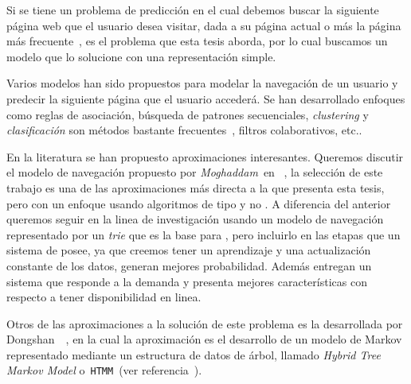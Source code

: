 

Si se tiene un problema de predicción en el cual debemos buscar la siguiente página web que el usuario desea visitar, dada a su página actual o más la página más frecuente~\cite{Poornalatha2012}, es el problema que esta tesis aborda, por lo cual buscamos un modelo que lo solucione con una representación simple.


Varios modelos han sido propuestos para modelar la navegación de un usuario y predecir la siguiente página que el usuario accederá. Se han desarrollado enfoques como  reglas de asociación, búsqueda de patrones secuenciales, \emph{clustering} y \emph{clasificación} son métodos bastante frecuentes~\cite{Moghaddam2009}, filtros colaborativos, etc.. 


En la literatura se han propuesto aproximaciones interesantes. Queremos discutir el modelo de navegación propuesto por \emph{Moghaddam}~\etal en ~\cite{Moghaddam2009}, la selección de este trabajo es una de las aproximaciones más directa a la que presenta esta tesis, pero con un enfoque usando algoritmos de tipo \losslessdatacompression y no \machinelearning. A  diferencia del anterior queremos seguir en la linea de investigación usando un modelo de navegación representado por un \emph{trie} que es la base para \lzSieteOcho, pero incluirlo en las etapas que un sistema de \machinelearning posee, ya que creemos tener un aprendizaje  y una actualización constante de los datos, generan mejores  probabilidad. Además entregan un sistema que responde a la demanda y presenta mejores características con respecto a tener disponibilidad en linea.

Otros de las aproximaciones a la solución de este problema es la desarrollada por {Dongshan}~\etal~\cite{Dongshan2002}, en la cual la aproximación es el desarrollo de un modelo de Markov representado mediante un estructura de datos de árbol, llamado \emph{Hybrid Tree Markov Model} o~\texttt{HTMM}~(ver referencia~\cite{Dongshan2002}).
\uncm
 

 



